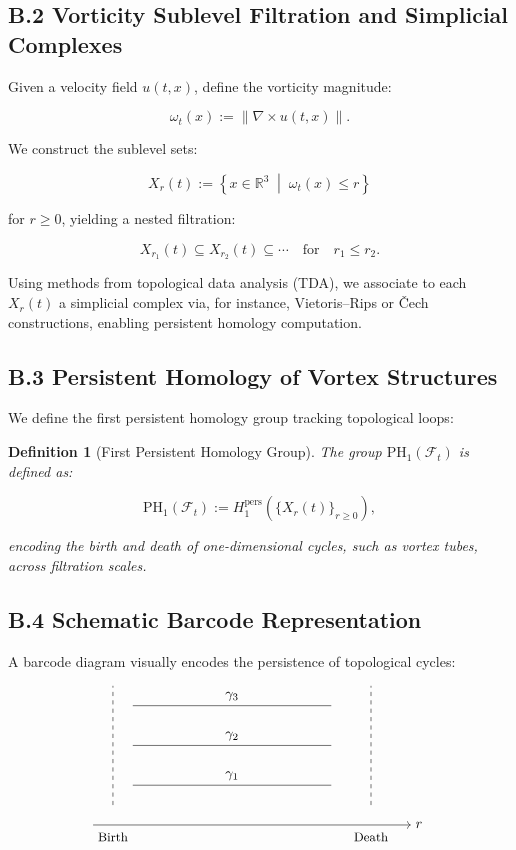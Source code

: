 \documentclass[11pt]{article}
\newtheorem{definition}[theorem]{Definition}
\begin{document}
\subsection*{B.2 Vorticity Sublevel Filtration and Simplicial Complexes}

Given a velocity field \( u(t, x) \), define the vorticity magnitude:

\[
\omega_t(x) := \| \nabla \times u(t, x) \|.
\]

We construct the sublevel sets:

\[
X_r(t) := \left\{ x \in \mathbb{R}^3 \;\middle|\; \omega_t(x) \leq r \right\}
\]

for \( r \geq 0 \), yielding a nested filtration:

\[
X_{r_1}(t) \subseteq X_{r_2}(t) \subseteq \cdots \quad \text{for} \quad r_1 \leq r_2.
\]

Using methods from topological data analysis (TDA), we associate to each \( X_r(t) \) a simplicial complex via, for instance, Vietoris–Rips or Čech constructions, enabling persistent homology computation.

\subsection*{B.3 Persistent Homology of Vortex Structures}

We define the first persistent homology group tracking topological loops:

\begin{definition}[First Persistent Homology Group]
The group \( \mathrm{PH}_1(\mathcal{F}_t) \) is defined as:

\[
\mathrm{PH}_1(\mathcal{F}_t) := H_1^{\mathrm{pers}} \left( \{ X_r(t) \}_{r \geq 0} \right),
\]

encoding the birth and death of one-dimensional cycles, such as vortex tubes, across filtration scales.
\end{definition}

\subsection*{B.4 Schematic Barcode Representation}

A barcode diagram visually encodes the persistence of topological cycles:

\[
\begin{tikzpicture}
\draw[->] (0,0) -- (8,0) node[right] {\( r \)};
\foreach \y/\label in {1/$\gamma_1$, 2/$\gamma_2$, 3/$\gamma_3$} {
  \draw (1,\y) -- (6,\y) node[midway, above] {\label};
}
\draw[dashed] (0.5,0.5) -- (0.5,3.5);
\draw[dashed] (7,0.5) -- (7,3.5);
\node at (0.5,-0.3) {\small Birth};
\node at (7,-0.3) {\small Death};
\end{tikzpicture}
\]
\end{document}
